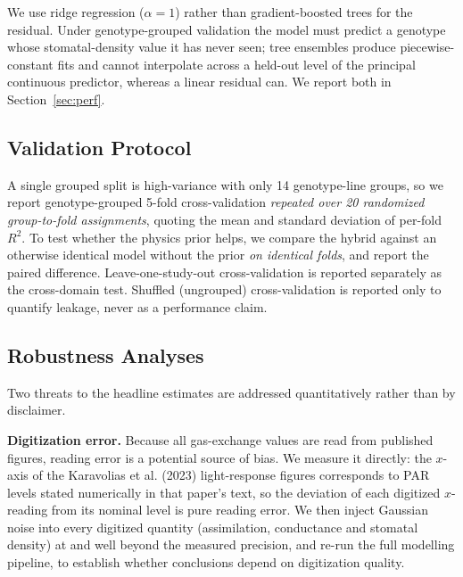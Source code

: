 \documentclass[runningheads]{llncs}
\begin{document}
We use ridge regression ($\alpha=1$) rather than gradient-boosted trees for the residual. Under genotype-grouped validation the model must predict a genotype whose stomatal-density value it has never seen; tree ensembles produce piecewise-constant fits and cannot interpolate across a held-out level of the principal continuous predictor, whereas a linear residual can. We report both in Section~\ref{sec:perf}.

\subsection{Validation Protocol}\label{sec:validation}

A single grouped split is high-variance with only 14 genotype-line groups, so we report genotype-grouped 5-fold cross-validation \emph{repeated over 20 randomized group-to-fold assignments}, quoting the mean and standard deviation of per-fold $R^{2}$. To test whether the physics prior helps, we compare the hybrid against an otherwise identical model without the prior \emph{on identical folds}, and report the paired difference. Leave-one-study-out cross-validation is reported separately as the cross-domain test. Shuffled (ungrouped) cross-validation is reported only to quantify leakage, never as a performance claim.

\subsection{Robustness Analyses}\label{sec:robustness}

Two threats to the headline estimates are addressed quantitatively rather than by disclaimer.

\textbf{Digitization error.} Because all gas-exchange values are read from published figures, reading error is a potential source of bias. We measure it directly: the $x$-axis of the Karavolias et al. (2023) light-response figures corresponds to PAR levels stated numerically in that paper's text, so the deviation of each digitized $x$-reading from its nominal level is pure reading error. We then inject Gaussian noise into every digitized quantity (assimilation, conductance and stomatal density) at and well beyond the measured precision, and re-run the full modelling pipeline, to establish whether conclusions depend on digitization quality.
\end{document}
